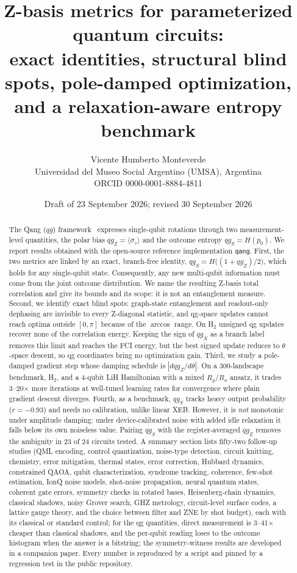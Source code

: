 \documentclass[11pt]{article}
\title{Z-basis metrics for parameterized quantum circuits:\\
exact identities, structural blind spots, pole-damped optimization,\\
and a relaxation-aware entropy benchmark}
\author{Vicente Humberto Monteverde\\
\small Universidad del Museo Social Argentino (UMSA), Argentina\\
\small ORCID 0000-0001-8884-4811}
\date{\small Draft of 23 September 2026; revised 30 September 2026}
\newcommand{\qgZ}{qg_Z}
\newcommand{\qgS}{qg_S}
\begin{document}
\maketitle

\begin{abstract}
The Qang ($qg$) framework~\cite{monteverde2026qang} expresses single-qubit rotations through two
measurement-level quantities, the polar bias $\qgZ=\langle\sigma_z\rangle$ and the outcome entropy
$\qgS=H(p_0)$. We report results obtained with the open-source reference implementation
\texttt{qang}. First, the two metrics are linked by an exact, branch-free identity,
$\qgS=H\big((1+\qgZ)/2\big)$, which holds for any single-qubit state. Consequently, any new
multi-qubit information must come from the joint outcome distribution. We name the resulting Z-basis total correlation and give its
bounds and its scope: it is not an entanglement measure. Second, we identify exact blind spots:
graph-state entanglement and readout-only dephasing are invisible to every Z-diagonal statistic,
and qg-space updates cannot reach optima outside $[0,\pi]$ because of the $\arccos$ range. On H$_2$
unsigned qg updates recover none of the correlation energy. Keeping the sign of $qg_X$ as a branch label removes this limit and reaches the FCI energy, but the best signed update reduces to $\theta$-space descent, so qg coordinates bring no optimization gain. Third, we study a pole-damped gradient step whose
damping schedule is $|d\qgZ/d\theta|$. On a 300-landscape benchmark, H$_2$, and a 4-qubit LiH
Hamiltonian with a mixed $R_y/R_x$ ansatz, it trades 3--20$\times$ more iterations at well-tuned
learning rates for convergence where plain gradient descent diverges. Fourth, as a benchmark, $\qgS$
tracks heavy output probability ($r=-0.93$) and needs no calibration, unlike linear XEB. However,
it is \emph{not} monotonic under amplitude damping: under device-calibrated noise with added idle
relaxation it falls below its own noiseless value. Pairing $\qgS$ with the register-averaged $\qgZ$
removes the ambiguity in 23 of 24 circuits tested. A summary section lists fifty-two follow-up
studies (QML encoding, control quantization, noise-type detection, circuit knitting, chemistry,
error mitigation, thermal states, error correction, Hubbard dynamics, constrained QAOA, qubit
characterization, syndrome tracking, coherence, few-shot estimation, IonQ noise models, shot-noise propagation, neural quantum states, coherent gate errors, symmetry checks in rotated bases, Heisenberg-chain dynamics, classical shadows, noisy Grover search, GHZ metrology, circuit-level surface codes, a lattice gauge theory, and the choice between filter and ZNE by shot budget), each with its classical or standard control; for the qg quantities, direct measurement is 3--41$\times$ cheaper than classical shadows, and the per-qubit reading loses to the outcome histogram when the answer is a bitstring; the symmetry-witness results are
developed in a companion paper. Every number is reproduced by a script and
pinned by a regression test in the public repository.
\end{abstract}
\end{document}
